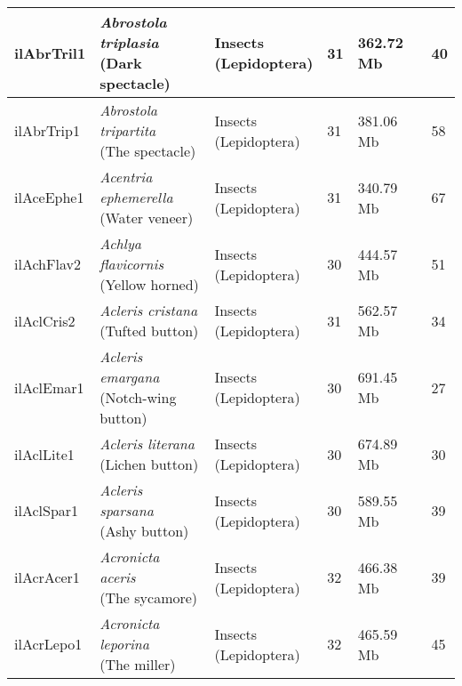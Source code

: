 \begin{centering}
\begin{longtable}{l|l|l|l|l|l}
ilAbrTril1 & \makecell[{l}]{\textit{Abrostola triplasia} \\ (Dark spectacle)} & \makecell[{l}]{Insects \\ (Lepidoptera)} & 31 & 362.72 Mb & 40  \\ \hline
ilAbrTrip1 & \makecell[{l}]{\textit{Abrostola tripartita} \\ (The spectacle)} & \makecell[{l}]{Insects \\ (Lepidoptera)} & 31 & 381.06 Mb & 58  \\ \hline
ilAceEphe1 & \makecell[{l}]{\textit{Acentria ephemerella} \\ (Water veneer)} & \makecell[{l}]{Insects \\ (Lepidoptera)} & 31 & 340.79 Mb & 67  \\ \hline
ilAchFlav2 & \makecell[{l}]{\textit{Achlya flavicornis} \\ (Yellow horned)} & \makecell[{l}]{Insects \\ (Lepidoptera)} & 30 & 444.57 Mb & 51  \\ \hline
ilAclCris2 & \makecell[{l}]{\textit{Acleris cristana} \\ (Tufted button)} & \makecell[{l}]{Insects \\ (Lepidoptera)} & 31 & 562.57 Mb & 34  \\ \hline
ilAclEmar1 & \makecell[{l}]{\textit{Acleris emargana} \\ (Notch-wing button)} & \makecell[{l}]{Insects \\ (Lepidoptera)} & 30 & 691.45 Mb & 27  \\ \hline
ilAclLite1 & \makecell[{l}]{\textit{Acleris literana} \\ (Lichen button)} & \makecell[{l}]{Insects \\ (Lepidoptera)} & 30 & 674.89 Mb & 30  \\ \hline
ilAclSpar1 & \makecell[{l}]{\textit{Acleris sparsana} \\ (Ashy button)} & \makecell[{l}]{Insects \\ (Lepidoptera)} & 30 & 589.55 Mb & 39  \\ \hline
ilAcrAcer1 & \makecell[{l}]{\textit{Acronicta aceris} \\ (The sycamore)} & \makecell[{l}]{Insects \\ (Lepidoptera)} & 32 & 466.38 Mb & 39  \\ \hline
ilAcrLepo1 & \makecell[{l}]{\textit{Acronicta leporina} \\ (The miller)} & \makecell[{l}]{Insects \\ (Lepidoptera)} & 32 & 465.59 Mb & 45  \\ \hline

\end{longtable}
\end{centering}
